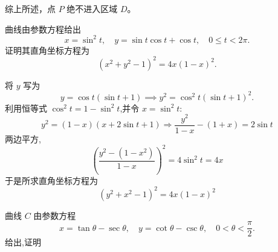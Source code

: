 \begin{questions}
\begin{parts}
\begin{solution}
        综上所述，点 $P$ 绝不进入区域 $D$。
    \end{solution}
\end{parts}
    \question 曲线由参数方程给出
    \[
    x = \sin^2 t, \quad y = \sin t \cos t + \cos t, \quad 0 \le t < 2\pi.
    \]
    证明其直角坐标方程为
    \[
    (x^2 + y^2 - 1)^2 = 4x(1-x)^2.
    \]
    \begin{solution}
        将 $y$ 写为
        \[
        y = \cos t (\sin t + 1) \implies y^2 = \cos^2 t (\sin t + 1)^2.
        \]
        利用恒等式 $\cos^2 t = 1 - \sin^2 t$,并令 $x = \sin^2 t$:
        \[
        y^2 = (1 - x)(x + 2\sin t + 1) \Rightarrow \frac{y^2}{1-x} - (1+x) = 2\sin t
        \]
        两边平方,
        \[
        \left( \dfrac{y^2 - (1-x^2)}{1-x} \right)^2 = 4 \sin^2 t = 4x
        \]
        于是所求直角坐标方程为
        \[
        (y^2 + x^2 - 1)^2 = 4x (1-x)^2
        \]
    \end{solution}

    \question 曲线 $C$ 由参数方程
    \[
    x = \tan\theta - \sec\theta, \quad y = \cot\theta - \csc\theta, \quad 0 < \theta < \frac{\pi}{2}.
    \]
    给出,证明
\end{questions}
